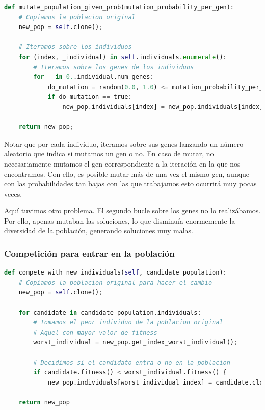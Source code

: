 \documentclass[11pt]{article}
\begin{document}
\begin{lstlisting}[language=Python, style=Boxed]
def mutate_population_given_prob(mutation_probability_per_gen):
    # Copiamos la poblacion original
    new_pop = self.clone();

    # Iteramos sobre los individuos
    for (index, _individual) in self.individuals.enumerate():
        # Iteramos sobre los genes de los individuos
        for _ in 0..individual.num_genes:
            do_mutation = random(0.0, 1.0) <= mutation_probability_per_gen;
            if do_mutation == true:
                new_pop.individuals[index] = new_pop.individuals[index].mutated();

    return new_pop;
\end{lstlisting}

Notar que por cada individuo, iteramos sobre sus genes lanzando un número aleatorio que indica si mutamos un gen o no. En caso de mutar, no necesariamente mutamos el gen correspondiente a la iteración en la que nos encontramos. Con ello, es posible mutar más de una vez el mismo gen, aunque con las probabilidades tan bajas con las que trabajamos esto ocurrirá muy pocas veces.

Aquí tuvimos otro problema. El segundo bucle sobre los genes no lo realizábamos. Por ello, apenas mutaban las soluciones, lo que disminuía enormemente la diversidad de la población, generando soluciones muy malas.

\subsubsection{Competición para entrar en la población}

\begin{lstlisting}[language=Python, style=Boxed]
def compete_with_new_individuals(self, candidate_population):
    # Copiamos la poblacion original para hacer el cambio
    new_pop = self.clone();

    for candidate in candidate_population.individuals:
        # Tomamos el peor individuo de la poblacion original
        # Aquel con mayor valor de fitness
        worst_individual = new_pop.get_index_worst_individual();

        # Decidimos si el candidato entra o no en la poblacion
        if candidate.fitness() < worst_individual.fitness() {
            new_pop.individuals[worst_individual_index] = candidate.clone();

    return new_pop
\end{lstlisting}
\end{document}

